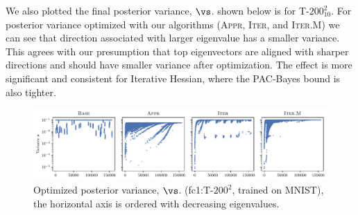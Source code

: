 We also plotted the final posterior variance, $\vs$.  shown below is for T-$200^2_{10}$. For posterior variance optimized with our algorithms (\textsc{Appr}, \textsc{Iter}, and \textsc{Iter.M}) we can see that direction associated with larger eigenvalue has a smaller variance. This agrees with our presumption that top eigenvectors are aligned with sharper directions and should have smaller variance after optimization. The effect is more significant and consistent for Iterative Hessian, where the PAC-Bayes bound is also tighter.
\begin{figure}[H]
    \centering
    \includegraphics[width=\textwidth]{Figures/PacBayes/FC2_10cls/sigma_post_compare_iter_iterH_Sigma_post_MNIST_Exp1FC2_fixlr0.01_fc1.weight.pdf}
    \caption{Optimized posterior variance, $\vs$. (fc1:T-$200^2$, trained on MNIST), the horizontal axis is ordered with decreasing eigenvalues.}
    \label{fig:app_PAC}
\end{figure}

\newpage



